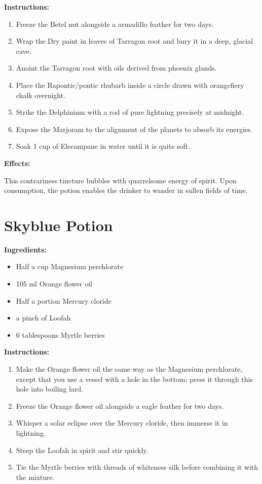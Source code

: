 \documentclass{article}
\begin{document}
\textbf{Instructions:}

\begin{enumerate}
  \item Freeze the Betel nut alongside a armadillo feather for two days.
  \item Wrap the Dry paint in leaves of Tarragon root and bury it in a deep, glacial cave.
  \item Anoint the Tarragon root with oils derived from phoenix glands.
  \item Place the Rapontic/pontic rhubarb inside a circle drawn with orangefiery chalk overnight.
  \item Strike the Delphinium with a rod of pure lightning precisely at midnight.
  \item Expose the Marjoram to the alignment of the planets to absorb its energies.
  \item Soak 1 cup of Elecampane in water until it is quite soft.
\end{enumerate}

\textbf{Effects:}

This contrariness tincture bubbles with quarrelsome energy of spirit. Upon consumption, the potion enables the drinker to wander in sullen fields of time.

\newpage
\section*{Skyblue Potion}

\textbf{Ingredients:}

\begin{itemize}
  \item Half a cup Magnesium perchlorate
  \item 105 ml Orange flower oil
  \item Half a portion Mercury cloride
  \item a pinch of Loofah
  \item 6 tablespoons Myrtle berries
\end{itemize}

\textbf{Instructions:}

\begin{enumerate}
  \item Make the Orange flower oil the same way as the Magnesium perchlorate, except that you use a vessel with a hole in the bottom; press it through this hole into boiling lard.
  \item Freeze the Orange flower oil alongside a eagle feather for two days.
  \item Whisper a solar eclipse over the Mercury cloride, then immerse it in lightning.
  \item Steep the Loofah in spirit and stir quickly.
  \item Tie the Myrtle berries with threads of whiteness silk before combining it with the mixture.
\end{enumerate}
\end{document}

